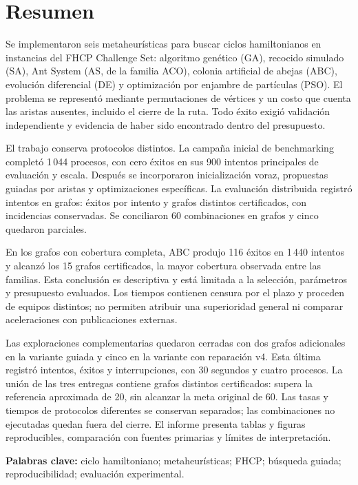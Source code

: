 \section*{Resumen}
Se implementaron seis metaheurísticas para buscar ciclos hamiltonianos en instancias del FHCP Challenge Set: algoritmo genético (GA), recocido simulado (SA), Ant System (AS, de la familia ACO), colonia artificial de abejas (ABC), evolución diferencial (DE) y optimización por enjambre de partículas (PSO). El problema se representó mediante permutaciones de vértices y un costo que cuenta las aristas ausentes, incluido el cierre de la ruta. Todo éxito exigió validación independiente y evidencia de haber sido encontrado dentro del presupuesto.

El trabajo conserva protocolos distintos. La campaña inicial de benchmarking completó 1\,044 procesos, con cero éxitos en sus 900 intentos principales de evaluación y escala. Después se incorporaron inicialización voraz, propuestas guiadas por aristas y optimizaciones específicas. La evaluación distribuida registró \TotalAttempts{} intentos en \StartedGraphs{} grafos: \TotalSuccesses{} éxitos por intento y \SolvedGraphs{} grafos distintos certificados, con \TotalErrors{} incidencias conservadas. Se conciliaron 60 combinaciones en \CompleteGraphs{} grafos y cinco quedaron parciales.

En los grafos con cobertura completa, ABC produjo 116 éxitos en 1\,440 intentos y alcanzó los 15 grafos certificados, la mayor cobertura observada entre las familias. Esta conclusión es descriptiva y está limitada a la selección, parámetros y presupuesto evaluados. Los tiempos contienen censura por el plazo y proceden de equipos distintos; no permiten atribuir una superioridad general ni comparar aceleraciones con publicaciones externas.

Las exploraciones complementarias quedaron cerradas con dos grafos adicionales en la variante guiada y cinco en la variante con reparación v4. Esta última registró \RepairAttempts{} intentos, \RepairSuccesses{} éxitos y \RepairErrors{} interrupciones, con 30 segundos y cuatro procesos. La unión de las tres entregas contiene \UnionCertifiedGraphs{} grafos distintos certificados: supera la referencia aproximada de 20, sin alcanzar la meta original de 60. Las tasas y tiempos de protocolos diferentes se conservan separados; las combinaciones no ejecutadas quedan fuera del cierre. El informe presenta tablas y figuras reproducibles, comparación con fuentes primarias y límites de interpretación.

\textbf{Palabras clave:} ciclo hamiltoniano; metaheurísticas; FHCP; búsqueda guiada; reproducibilidad; evaluación experimental.
\clearpage
